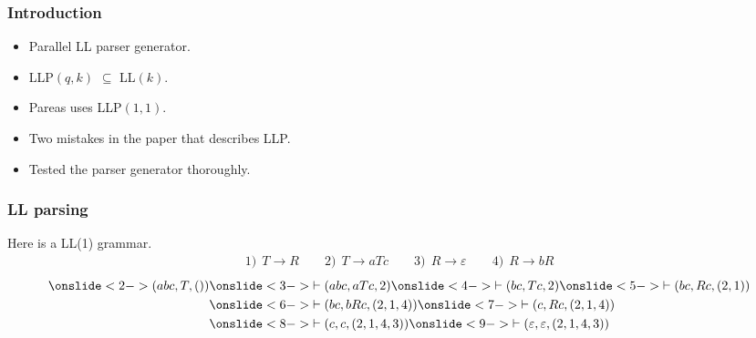 \documentclass[t,24pt]{beamer}
\begin{document}
\begin{frame}[hvid]
    \frametitle{Introduction}
    \begin{itemize}
        \item Parallel LL parser generator.
        \item LLP$(q,k)$ $\subseteq$ LL$(k)$.
        \item Pareas uses LLP$(1, 1)$.
        \item Two mistakes in the paper that describes LLP.
        \item Tested the parser generator thoroughly.
    \end{itemize}
\end{frame}


\begin{frame}
    \frametitle{LL parsing}
    Here is a LL(1) grammar.
    \begin{align*}
        1)\:\: T \to R \qquad 2)\:\: T \to aTc \qquad 3)\:\: R \to \varepsilon \qquad 4)\:\: R \to bR
    \end{align*}
    \begin{align*}
        \onslide<2->{(abc, T, ())} & \onslide<3->{\vdash (abc, aTc, 2)} \onslide<4->{\vdash (bc, Tc, 2)} \onslide<5->{\vdash (bc, Rc, (2, 1))} \\
                                   & \onslide<6->{\vdash (bc, bRc, (2, 1, 4))} \onslide<7->{\vdash (c, Rc, (2, 1, 4))}                         \\
                                   & \onslide<8->{\vdash (c, c, (2, 1, 4, 3))} \onslide<9->{\vdash (\varepsilon, \varepsilon, (2, 1, 4, 3))}
    \end{align*}
\end{frame}
\end{document}
